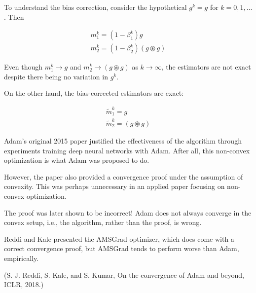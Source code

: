 \documentclass{report}
\begin{document}
\begin{concept}
    To understand the bias correction, consider the hypothetical $g^{k}=g$ for $k=0,1, \ldots$. Then

    $$
    \begin{gathered}
    m_{1}^{k}=\left(1-\beta_{1}^{k}\right) g \\
    m_{2}^{k}=\left(1-\beta_{2}^{k}\right)(g \circledast g)
    \end{gathered}
    $$

    Even though $m_{1}^{k} \rightarrow g$ and $m_{2}^{k} \rightarrow(g \circledast g)$ as $k \rightarrow \infty$, the estimators are not exact despite there being no variation in $g^{k}$.

    On the other hand, the bias-corrected estimators are exact:

    $$
    \begin{gathered}
    \widetilde{m}_{1}^{k}=g \\
    \widetilde{m}_{2}^{k}=(g \circledast g)
    \end{gathered}
    $$
\end{concept}

\begin{concept}
    Adam's original 2015 paper justified the effectiveness of the algorithm through experiments training deep neural networks with Adam. After all, this non-convex optimization is what Adam was proposed to do.

    However, the paper also provided a convergence proof under the assumption of convexity. This was perhaps unnecessary in an applied paper focusing on non-convex optimization.

    The proof was later shown to be incorrect! Adam does not always converge in the convex setup, i.e., the algorithm, rather than the proof, is wrong.

    Reddi and Kale presented the AMSGrad optimizer, which does come with a correct convergence proof, but AMSGrad tends to perform worse than Adam, empirically.

    (S. J. Reddi, S. Kale, and S. Kumar, On the convergence of Adam and beyond, ICLR, 2018.)
\end{concept}
\end{document}
